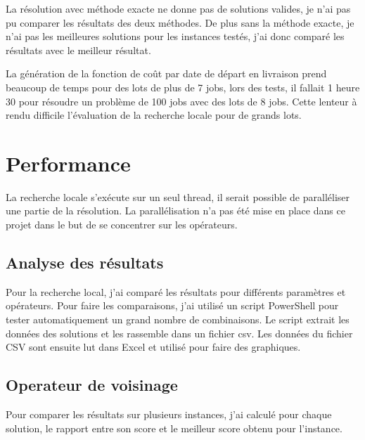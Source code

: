 La résolution avec méthode exacte ne donne pas de solutions valides, je n'ai pas pu comparer les résultats des deux méthodes.
De plus sans la méthode exacte, je n'ai pas les meilleures solutions pour les instances testés,
j'ai donc comparé les résultats avec le meilleur résultat.

La génération de la fonction de coût par date de départ en livraison prend beaucoup de temps pour des lots de plus de 7 jobs,
lors des tests, il fallait 1 heure 30 pour résoudre un problème de 100 jobs avec des lots de 8 jobs.
Cette lenteur à rendu difficile l'évaluation de la recherche locale pour de grands lots.


\section{Performance}
La recherche locale s'exécute sur un seul thread, il serait possible de paralléliser une partie de la résolution.
La parallélisation n'a pas été mise en place dans ce projet dans le but de se concentrer sur les opérateurs.

\subsection{Analyse des résultats}

Pour la recherche local, j'ai comparé les résultats pour différents paramètres et opérateurs.
Pour faire les comparaisons, j'ai utilisé un script PowerShell pour tester automatiquement un grand nombre de combinaisons.
Le script extrait les données des solutions et les rassemble dans un fichier csv.
Les données du fichier CSV sont ensuite lut dans Excel et utilisé pour faire des graphiques.
\subsection{Operateur de voisinage}
Pour comparer les résultats sur plusieurs instances, j'ai calculé pour chaque solution, le rapport entre son score et le meilleur score obtenu pour l'instance.

